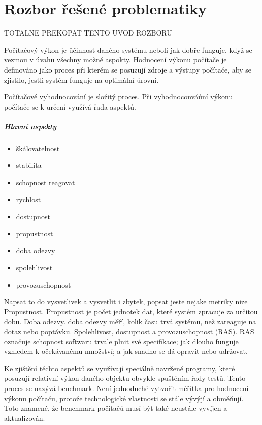 \chapter{Rozbor řešené problematiky}

TOTALNE PREKOPAT TENTO UVOD ROZBORU

Počítačový výkon je ůčinnost daného systému neboli jak dobře funguje, když se vezmou v úvahu všechny možné aspokty.
Hodnocení výkonu počítače je definováno jako proces při kterém se posuzují zdroje a výstupy počítače, aby se zjistilo,
jestli systém funguje na optimální úrovni.

Počítačové vyhodnocování je složitý proces. Při vyhodnoconváůní výkonu počítače se k určení využívá řada aspektů.
\paragraph{Hlavní aspekty}\cite{metricsToday}
\begin{itemize}
    \item{škálovatelnost}
    \item{stabilita}
    \item{schopnost reagovat}
    \item{rychlost}
    \item{dostupnost}
    \item{propustnost}
    \item{doba odezvy}
    \item{spolehlivost}
    \item{provozuschopnost}
\end{itemize}

Napsat to do vysvetlivek a vysvetlit i zbytek, popsat jeste nejake metriky nize
Propustnost. Propustnost je počet jednotek dat, které systém zpracuje za určitou dobu.
Doba odezvy. doba odezvy měří, kolik času trvá systému, než zareaguje na dotaz nebo poptávku.
Spolehlivost, dostupnost a provozuschopnost (RAS). RAS označuje schopnost softwaru trvale plnit své specifikace; jak dlouho funguje vzhledem k očekávanému množství; a jak snadno se dá opravit nebo udržovat.

Ke zjištění těchto aspektů se využívají speciálně navržené programy, které posuzují relativní výkon daného objektu obvykle spušténím řady testů.
Tento proces se nazývá benchmark. Není jednoduché vytvořit měřítka pro hodnocení výkonu počítaču, protože technologické vlastnosti se stále vývýjí a obměňují.
Toto znamené, že benchmark počítačů musí být také neustále vyvíjen a aktualizován.

